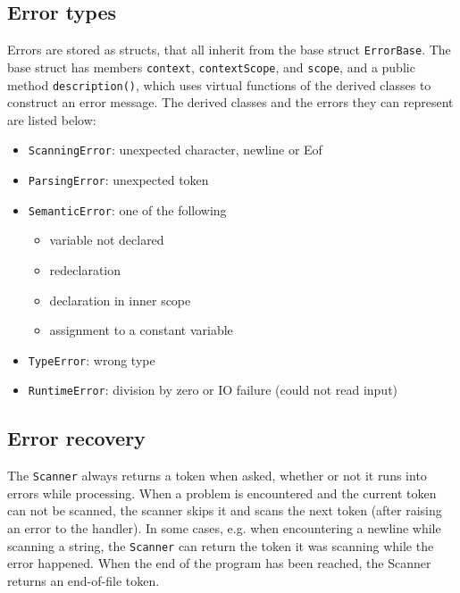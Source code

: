\documentclass[a4paper]{article}
\newcommand*{\code}[1]{\texttt{#1}}
\begin{document}
\subsection{Error types}

Errors are stored as structs, that all inherit from the 
base struct \code{ErrorBase}. The base struct has members 
\code{context}, \code{contextScope}, and \code{scope}, 
and a public method \code{description()}, which uses 
virtual functions of the derived classes to construct an 
error message. The derived classes and the errors they 
can represent are listed below:
\begin{itemize}
  \item \code{ScanningError}: unexpected character, newline or Eof
  \item \code{ParsingError}: unexpected token
  \item \code{SemanticError}: one of the following
  \begin{itemize}
    \item variable not declared
    \item redeclaration
    \item declaration in inner scope
    \item assignment to a constant variable
  \end{itemize}
  \item \code{TypeError}: wrong type
  \item \code{RuntimeError}: division by zero or IO failure (could not read input)
\end{itemize}


\subsection{Error recovery}

The \code{Scanner} always returns a token when asked, whether or 
not it runs into errors while processing. When a problem is 
encountered and the current token can not be scanned, the scanner 
skips it and scans the next token (after raising an error to the 
handler). In some cases, e.g. when encountering a newline while 
scanning a string, the \code{Scanner} can return the token it 
was scanning while the error happened. When the end of the 
program has been reached, the Scanner returns an end-of-file token.
\end{document}
